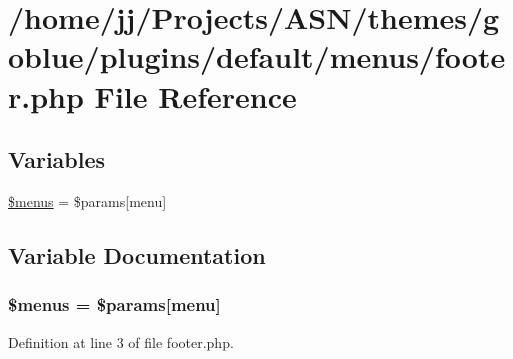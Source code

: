\hypertarget{menus_2footer_8php}{}\section{/home/jj/\+Projects/\+A\+S\+N/themes/goblue/plugins/default/menus/footer.php File Reference}
\label{menus_2footer_8php}
\subsection*{Variables}
\begin{DoxyCompactItemize}
\item 
\hyperlink{menus_2footer_8php_a681cf86fb2440a8c89c88603a08670ba}{\$menus} = \$params\mbox{[}\textquotesingle{}menu\textquotesingle{}\mbox{]}
\end{DoxyCompactItemize}


\subsection{Variable Documentation}
\subsubsection[{\texorpdfstring{\$menus}{$menus}}]{\setlength{\rightskip}{0pt plus 5cm}\$menus = \$params\mbox{[}\textquotesingle{}menu\textquotesingle{}\mbox{]}}\hypertarget{menus_2footer_8php_a681cf86fb2440a8c89c88603a08670ba}{}\label{menus_2footer_8php_a681cf86fb2440a8c89c88603a08670ba}


Definition at line 3 of file footer.\+php.

